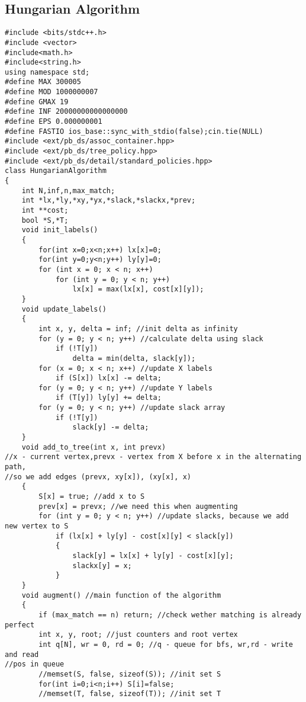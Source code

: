 \documentclass{article}
\begin{document}
\begin{multicols}{3}[]
\begin{verbatim}
\end{verbatim}


\subsection{Hungarian Algorithm}

\begin{verbatim}
#include <bits/stdc++.h>
#include <vector>
#include<math.h>
#include<string.h>
using namespace std;
#define MAX 300005
#define MOD 1000000007
#define GMAX 19
#define INF 20000000000000000
#define EPS 0.000000001
#define FASTIO ios_base::sync_with_stdio(false);cin.tie(NULL)
#include <ext/pb_ds/assoc_container.hpp>
#include <ext/pb_ds/tree_policy.hpp>
#include <ext/pb_ds/detail/standard_policies.hpp>
class HungarianAlgorithm
{
    int N,inf,n,max_match;
    int *lx,*ly,*xy,*yx,*slack,*slackx,*prev;
    int **cost;
    bool *S,*T;
    void init_labels()
    {
        for(int x=0;x<n;x++) lx[x]=0;
        for(int y=0;y<n;y++) ly[y]=0;
        for (int x = 0; x < n; x++)
            for (int y = 0; y < n; y++)
                lx[x] = max(lx[x], cost[x][y]);
    }
    void update_labels()
    {
        int x, y, delta = inf; //init delta as infinity
        for (y = 0; y < n; y++) //calculate delta using slack
            if (!T[y])
                delta = min(delta, slack[y]);
        for (x = 0; x < n; x++) //update X labels
            if (S[x]) lx[x] -= delta;
        for (y = 0; y < n; y++) //update Y labels
            if (T[y]) ly[y] += delta;
        for (y = 0; y < n; y++) //update slack array
            if (!T[y])
                slack[y] -= delta;
    }
    void add_to_tree(int x, int prevx)
//x - current vertex,prevx - vertex from X before x in the alternating path,
//so we add edges (prevx, xy[x]), (xy[x], x)
    {
        S[x] = true; //add x to S
        prev[x] = prevx; //we need this when augmenting
        for (int y = 0; y < n; y++) //update slacks, because we add new vertex to S
            if (lx[x] + ly[y] - cost[x][y] < slack[y])
            {
                slack[y] = lx[x] + ly[y] - cost[x][y];
                slackx[y] = x;
            }
    }
    void augment() //main function of the algorithm
    {
        if (max_match == n) return; //check wether matching is already perfect
        int x, y, root; //just counters and root vertex
        int q[N], wr = 0, rd = 0; //q - queue for bfs, wr,rd - write and read
//pos in queue
        //memset(S, false, sizeof(S)); //init set S
        for(int i=0;i<n;i++) S[i]=false;
        //memset(T, false, sizeof(T)); //init set T

\end{verbatim}
\end{multicols}
\end{document}
